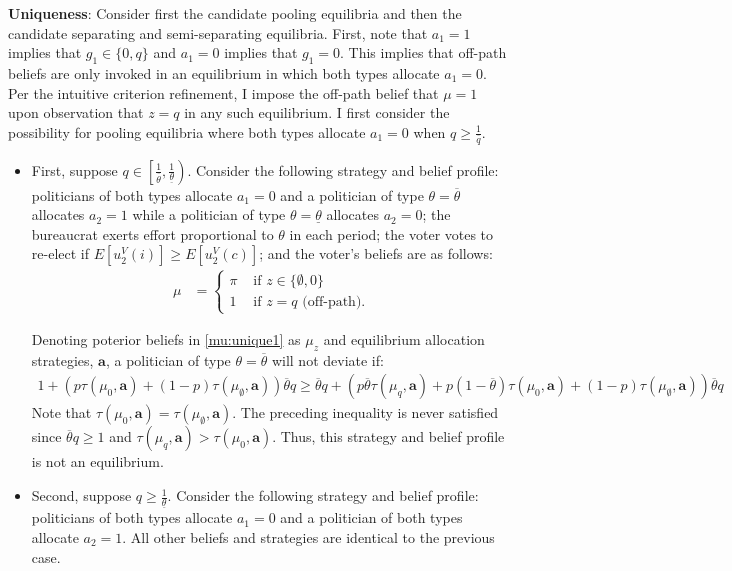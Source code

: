 \documentclass[11pt,english]{article}
\begin{document}
\textbf{Uniqueness}: Consider first the candidate pooling equilibria and then the candidate separating and semi-separating equilibria. First, note that  $a_1 = 1$ implies that $g_1 \in \{0,q\}$ and $a_1=0 $ implies that $g_1 = 0$. This implies that off-path beliefs are only invoked in an equilibrium in which both types allocate $a_1 = 0$. Per the intuitive criterion refinement, I impose the off-path belief that $\mu = 1$ upon observation that $z = q$ in any such equilibrium. I first consider the possibility for pooling equilibria where both types allocate $a_1=0$ when $q \geq \frac{1}{\overline{q}}$.
\begin{itemize}
\item First, suppose $q \in \left[\frac{1}{\overline{\theta}}, \frac{1}{\underline{\theta}}\right)$. Consider the following strategy and belief profile: politicians of both types allocate $a_1 = 0$ and a politician of type $\theta = \overline{\theta}$  allocates $a_2 = 1$ while a politician of type $\theta = \underline{\theta}$ allocates $a_2 = 0$; the bureaucrat exerts effort proportional to $\theta$ in each period; the voter votes to re-elect if $E[u_2^V(i)] \geq E[u_2^V(c)]$; and the voter's beliefs are as follows:
\begin{align}\label{mu:unique1}
\mu &= \begin{cases}
\pi & \text{ if } z \in \{\emptyset, 0\}\\
1 & \text{ if } z = q \text{ (off-path)}.
\end{cases}
\end{align}

Denoting poterior beliefs in \eqref{mu:unique1} as $\mu_z$ and equilibrium allocation strategies, $\boldsymbol{a}$, a politician of type $\theta = \overline{\theta}$ will not deviate if:
\begin{align*}
1 + (p\tau(\mu_0, \boldsymbol{a}) + (1-p)\tau(\mu_\emptyset, \boldsymbol{a}))\overline{\theta}q \geq \overline{\theta}q + (p\overline{\theta}\tau(\mu_q, \boldsymbol{a}) + p(1-\overline{\theta})\tau(\mu_0, \boldsymbol{a}) + (1-p)\tau(\mu_\emptyset, \boldsymbol{a}))\overline{\theta}q
\end{align*}
Note that $\tau(\mu_0, \boldsymbol{a}) =\tau(\mu_\emptyset, \boldsymbol{a})$. The preceding inequality is never satisfied since $\overline{\theta}q \geq 1$ and $\tau(\mu_q, \boldsymbol{a}) > \tau(\mu_0, \boldsymbol{a})$. Thus, this strategy and belief profile is not an equilibrium.
\item Second, suppose $q \geq \frac{1}{\underline{\theta}}$. Consider the following strategy and belief profile: politicians of both types allocate $a_1 = 0$ and a politician of both types allocate $a_2 = 1$. All other beliefs and strategies are identical to the previous case. 


\end{itemize}
\end{document}
